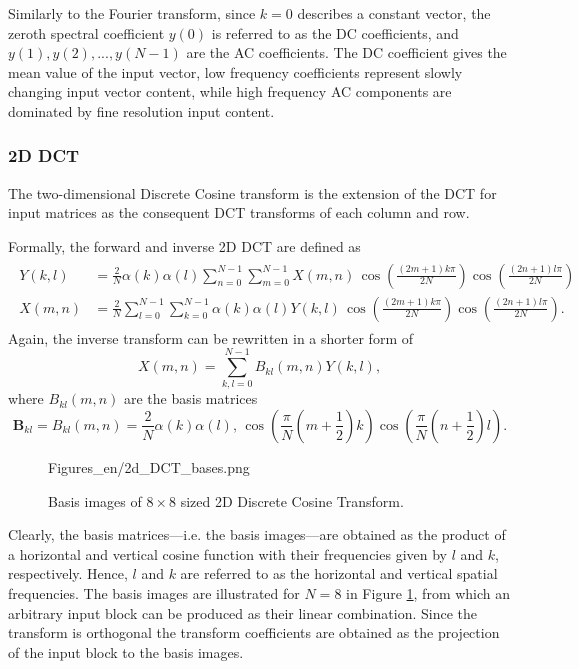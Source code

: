 Similarly to the Fourier transform, since $k=0$ describes a constant vector, the zeroth spectral coefficient $y(0)$ is referred to as the DC coefficients, and $y(1),y(2),...,y(N-1)$ are the AC coefficients.
The DC coefficient gives the mean value of the input vector, low frequency coefficients represent slowly changing input vector content, while high frequency AC components are dominated by fine resolution input content.

\subsubsection*{2D DCT}
The two-dimensional Discrete Cosine transform is the extension of the DCT for input matrices as the consequent DCT transforms of each column and row.

Formally, the forward and inverse 2D DCT are defined as 
\begin{align*}
\begin{split}
Y(k,l) &= \frac{2}{N} \alpha(k) \alpha(l) \sum_{n = 0}^{N-1} \sum_{m = 0}^{N-1}
X(m,n) \, \cos\left( \frac{(2m +1) k\pi}{2N}\right)
\cos\left( \frac{(2n +1) l\pi}{2N}\right) \\
X(m,n) &= \frac{2}{N}  \sum_{l = 0}^{N-1} \sum_{k = 0}^{N-1} \alpha(k) \alpha(l)
Y(k,l) \, \cos\left( \frac{(2m +1) k\pi}{2N}\right)
\cos\left( \frac{(2n +1) l\pi}{2N}\right).
\end{split}
\end{align*}
Again, the inverse transform can be rewritten in a shorter form of
\begin{equation}
X(m,n) = \sum_{k,l = 0}^{N-1} B_{kl}(m,n) Y(k,l),
\end{equation}
where $B_{kl}(m,n)$ are the basis matrices
\begin{equation}
\mathbf{B}_{kl} =  B_{kl}(m,n) = \frac{2}{N} \alpha(k)\alpha(l),  \, \cos\left( \frac{\pi}{N} \left( m + \frac{1}{2}\right) k \right)
\cos\left( \frac{\pi}{N} \left( n + \frac{1}{2}\right) l \right).
\end{equation}

\begin{figure}[]
	\centering
	\begin{minipage}[c]{0.68\textwidth}
	\begin{overpic}[width = 1\columnwidth ]{Figures_en/2d_DCT_bases.png}
	\end{overpic}   \end{minipage}\hfill
		\begin{minipage}[c]{0.3\textwidth}
	\caption{Basis images of $8\times8$ sized 2D Discrete Cosine Transform.}
	\label{Fig:2D_DCT}  \end{minipage}
\end{figure}
Clearly, the basis matrices---i.e. the basis images---are obtained as the product of a horizontal and vertical cosine function with their frequencies given by $l$ and $k$, respectively.
Hence, $l$ and $k$ are referred to as the horizontal and vertical spatial frequencies.
The basis images are illustrated for $N=8$ in Figure \ref{Fig:2D_DCT}, from which an arbitrary input block can be produced as their linear combination.
Since the transform is orthogonal the transform coefficients are obtained as the projection of the input block to the basis images.

